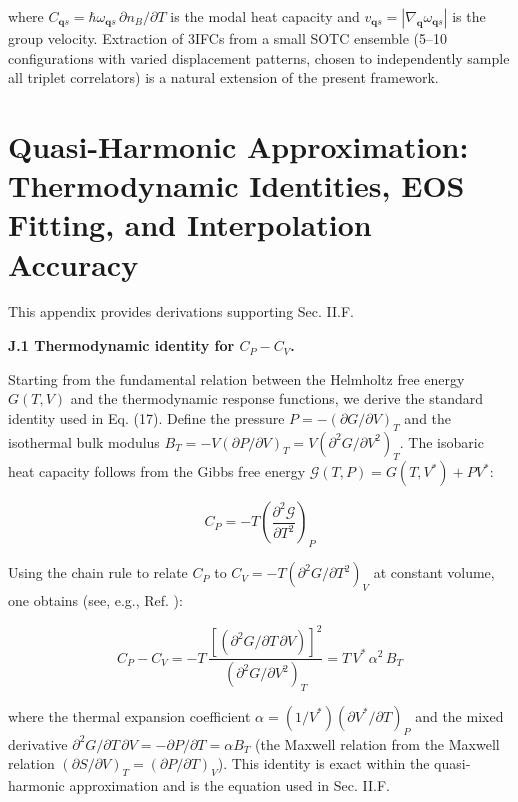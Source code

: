 \documentclass[aps,prb,reprint,amsmath,amssymb,floatfix]{revtex4-2}
\begin{document}
where
\(C_{\mathbf{q}s} = \hbar\omega_{\mathbf{q}s}\,\partial n_B/\partial T\)
is the modal heat capacity and
\(v_{\mathbf{q}s} = |\nabla_\mathbf{q}\omega_{\mathbf{q}s}|\) is the
group velocity. Extraction of 3IFCs from a small SOTC ensemble (5--10
configurations with varied displacement patterns, chosen to
independently sample all triplet correlators) is a natural extension of
the present framework.


\section{Quasi-Harmonic Approximation: Thermodynamic
Identities, EOS Fitting, and Interpolation
Accuracy}\label{appendix-j-quasi-harmonic-approximation-thermodynamic-identities-eos-fitting-and-interpolation-accuracy}

This appendix provides derivations supporting Sec. II.F.

\textbf{J.1 Thermodynamic identity for \(C_P - C_V\).}

Starting from the fundamental relation between the Helmholtz free energy
\(G(T,V)\) and the thermodynamic response functions, we derive the
standard identity used in Eq. (17). Define the pressure
\(P = -(\partial G/\partial V)_T\) and the isothermal bulk modulus
\(B_T = -V(\partial P/\partial V)_T = V(\partial^2 G/\partial V^2)_T\).
The isobaric heat capacity follows from the Gibbs free energy
\(\mathcal{G}(T,P) = G(T,V^*) + PV^*\):

\begin{equation*}
C_P = -T\left(\frac{\partial^2 \mathcal{G}}{\partial T^2}\right)_P
\end{equation*}

Using the chain rule to relate \(C_P\) to
\(C_V = -T(\partial^2 G/\partial T^2)_V\) at constant volume, one
obtains (see, e.g., Ref. \cite{ref44}):

\begin{equation*}
C_P - C_V = -T\,\frac{\left[(\partial^2 G/\partial T\,\partial V)\right]^2}{(\partial^2 G/\partial V^2)_T} = T\,V^*\,\alpha^2\,B_T
\end{equation*}

where the thermal expansion coefficient
\(\alpha = (1/V^*)(\partial V^*/\partial T)_P\) and the mixed derivative
\(\partial^2 G/\partial T\,\partial V = -\partial P/\partial T = \alpha B_T\)
(the Maxwell relation from the Maxwell relation
\((\partial S/\partial V)_T = (\partial P/\partial T)_V\)). This
identity is exact within the quasi-harmonic approximation and is the
equation used in Sec. II.F.
\end{document}
